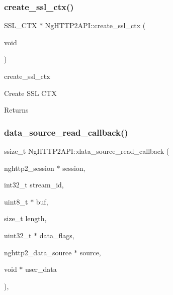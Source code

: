 \subsubsection{\texorpdfstring{create\+\_\+ssl\+\_\+ctx()}{create\_ssl\_ctx()}}
{\footnotesize\ttfamily S\+S\+L\+\_\+\+C\+TX $\ast$ Ng\+H\+T\+T\+P2\+A\+P\+I\+::create\+\_\+ssl\+\_\+ctx (\begin{DoxyParamCaption}\item[{void}]{ }\end{DoxyParamCaption})}



create\+\_\+ssl\+\_\+ctx 

Create S\+SL C\+TX \begin{DoxyReturn}{Returns}

\end{DoxyReturn}
\mbox{\label{classNetwork_1_1HTTP2_1_1NgHTTP2API_a419c427d7059d6d1858136f6913a1ae6}} 
\subsubsection{\texorpdfstring{data\+\_\+source\+\_\+read\+\_\+callback()}{data\_source\_read\_callback()}}
{\footnotesize\ttfamily ssize\+\_\+t Ng\+H\+T\+T\+P2\+A\+P\+I\+::data\+\_\+source\+\_\+read\+\_\+callback (\begin{DoxyParamCaption}\item[{nghttp2\+\_\+session $\ast$}]{session,  }\item[{int32\+\_\+t}]{stream\+\_\+id,  }\item[{uint8\+\_\+t $\ast$}]{buf,  }\item[{size\+\_\+t}]{length,  }\item[{uint32\+\_\+t $\ast$}]{data\+\_\+flags,  }\item[{nghttp2\+\_\+data\+\_\+source $\ast$}]{source,  }\item[{void $\ast$}]{user\+\_\+data }\end{DoxyParamCaption})\hspace{0.3cm}{\ttfamily [static]}, {\ttfamily [protected]}}



